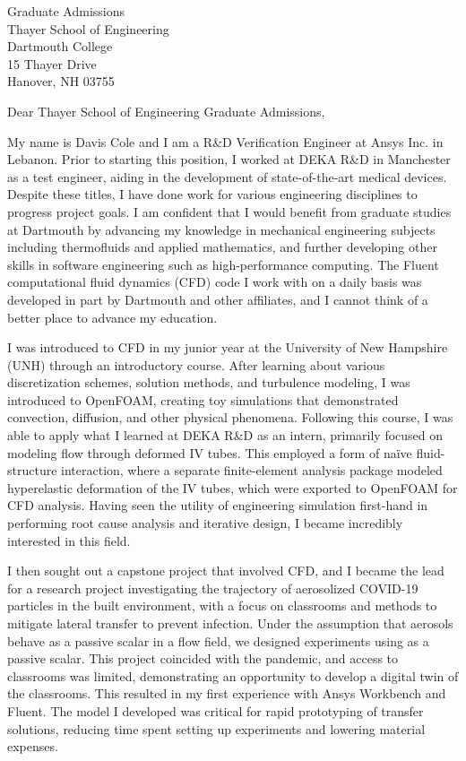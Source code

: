 \documentclass{letter}
\begin{document}
\begin{letter}{Graduate Admissions \\ Thayer School of Engineering \\ Dartmouth College \\ 15 Thayer Drive \\ Hanover, NH 03755}
    \opening{Dear Thayer School of Engineering Graduate Admissions,}

    My name is Davis Cole and I am a R\&D Verification Engineer
    at Ansys Inc. in Lebanon. Prior to starting this position, 
    I worked at DEKA R\&D in Manchester as a test engineer, 
    aiding in the development of state-of-the-art medical devices. 
    Despite these titles, I have done work for various engineering
    disciplines to progress project goals. I am confident that I 
    would benefit from graduate studies at Dartmouth by advancing 
    my knowledge in mechanical engineering subjects including 
    thermofluids and applied mathematics, and further developing 
    other skills in software engineering such as high-performance 
    computing. The Fluent computational fluid dynamics (CFD) code 
    I work with on a daily basis was developed in part by Dartmouth 
    and other affiliates, and I cannot think of a better place to 
    advance my education.

    I was introduced to CFD in my junior year at the University of 
    New Hampshire (UNH) through an introductory course. After learning 
    about various discretization schemes, solution methods, and turbulence 
    modeling, I was introduced to OpenFOAM, creating toy simulations that 
    demonstrated convection, diffusion, and other physical phenomena. 
    Following this course, I was able to apply what I learned at DEKA R\&D 
    as an intern, primarily focused on modeling flow through deformed IV tubes. 
    This employed a form of na\"ive fluid-structure interaction, where a 
    separate finite-element analysis package modeled hyperelastic deformation 
    of the IV tubes, which were exported to OpenFOAM for CFD analysis. Having 
    seen the utility of engineering simulation first-hand in performing root 
    cause analysis and iterative design, I became incredibly interested in 
    this field.

    I then sought out a capstone project that involved CFD, and I became the 
    lead for a research project investigating the trajectory of aerosolized 
    COVID-19 particles in the built environment, with a focus on classrooms 
    and methods to mitigate lateral transfer to prevent infection. Under the 
    assumption that aerosols behave as a passive scalar in a flow field, we 
    designed experiments using  as a passive scalar. This project 
    coincided with the pandemic, and access to classrooms was limited, 
    demonstrating an opportunity to develop a digital twin of the classrooms. 
    This resulted in my first experience with Ansys Workbench and Fluent. 
    The model I developed was critical for rapid prototyping of transfer 
    solutions, reducing time spent setting up experiments and lowering material 
    expenses.


\end{letter}
\end{document}
